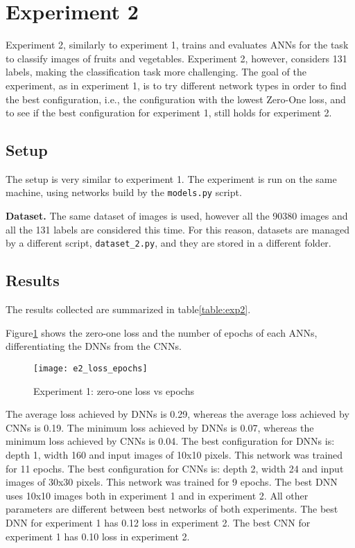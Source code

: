 \section{Experiment 2}
\label{sec:exp2}
Experiment 2, similarly to experiment 1, trains and evaluates ANNs for the task to classify images of fruits and vegetables. Experiment 2, however, considers 131 labels, making the classification task more challenging. The goal of the experiment, as in experiment 1, is to try different network types in order to find the best configuration, i.e., the configuration with the lowest Zero-One loss, and to see if the best configuration for experiment 1, still holds for experiment 2.

\subsection{Setup}
The setup is very similar to experiment 1. The experiment is run on the same machine, using networks build by the \texttt{models.py} script.

\textbf{Dataset.} The same dataset of images is used, however all the 90380 images and all the 131 labels are considered this time. For this reason, datasets are managed by a different script, \texttt{dataset\_2.py}, and they are stored in a different folder.

\subsection{Results}
The results collected are summarized in table\ref{table:exp2}.


Figure\ref{fig:e2_loss_epochs} shows the zero-one loss and the number of epochs of each ANNs, differentiating the DNNs from the CNNs.
\begin{figure}
\texttt{[image: e2\_loss\_epochs]}
\caption{Experiment 1: zero-one loss vs epochs}\label{fig:e2_loss_epochs}
\end{figure}
The average loss achieved by DNNs is 0.29, whereas the average loss achieved by CNNs is 0.19. The minimum loss achieved by DNNs is 0.07, whereas the minimum loss achieved by CNNs is 0.04. The best configuration for DNNs is: depth 1, width 160 and input images of 10x10 pixels. This network was trained for 11 epochs. The best configuration for CNNs is: depth 2, width 24 and input images of 30x30 pixels. This network was trained for 9 epochs. The best DNN uses 10x10 images both in experiment 1 and in experiment 2. All other parameters are different between best networks of both experiments. The best DNN for experiment 1 has 0.12 loss in experiment 2. The best CNN for experiment 1 has 0.10 loss in experiment 2.

